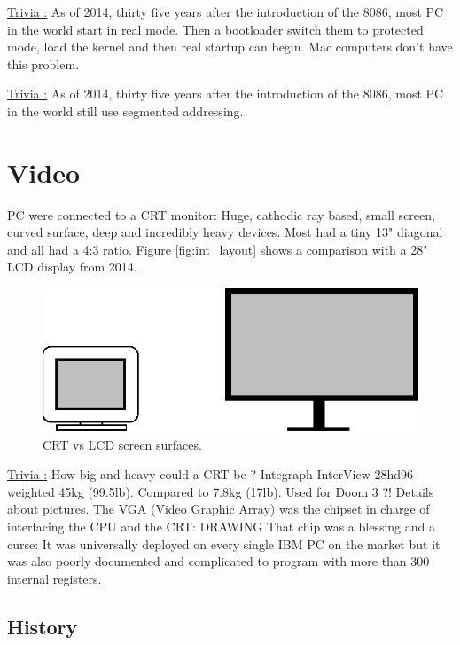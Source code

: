 \documentclass[book.tex]{subfiles}
\begin{document}
{\underline{Trivia :}}  As of 2014, thirty five years after the introduction of the 8086, most PC in the world start in  real mode. Then a bootloader switch them to protected mode, load the kernel and then real startup can begin. Mac computers don't have this problem.

\bigskip

{\underline{Trivia :}}  As of 2014, thirty five years after the introduction of the 8086, most PC in the world still use segmented addressing.




\section{Video}

PC were connected to a CRT monitor: Huge, cathodic ray based, small screen, curved surface, deep and incredibly heavy devices. Most had a tiny 13" diagonal and all had a 4:3 ratio. Figure \ref{fig:int_layout} shows a comparison with a 28" LCD display from 2014.


\begin{figure}[H]
\centering
\includegraphics[scale=1.2]{imgs/crt_lcd.eps}
\caption{CRT vs LCD screen surfaces.}
\label{fig:lcd_vs_crt}
\end{figure}

{\underline{Trivia :}} How big and heavy could a CRT be ? Integraph InterView 28hd96 weighted 45kg (99.5lb). Compared to 7.8kg (17lb). Used for Doom 3 ?! Details about pictures.
\bigskip
The VGA (Video Graphic Array) was the chipset in charge of interfacing the CPU and the CRT:
\bigskip
DRAWING
\bigskip
That chip was a blessing and a curse: It was universally deployed on every single IBM PC on the market but it was also poorly documented and complicated to program with more than 300 internal registers.



  \subsection{History}
\end{document}
